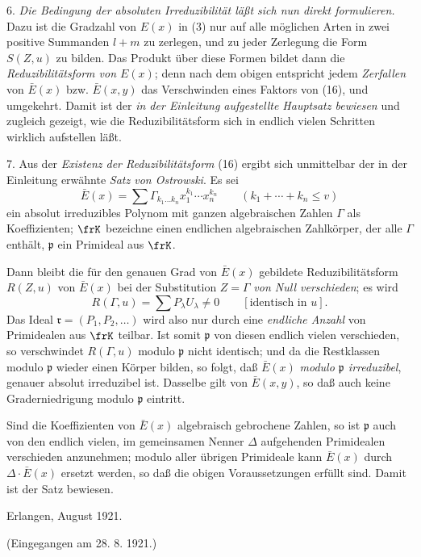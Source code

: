 6. \emph{Die Bedingung der absoluten Irreduzibilität läßt sich nun direkt formulieren.} Dazu ist die Gradzahl von $E(x)$ in (3) nur auf alle möglichen Arten in zwei positive Summanden $l+m$ zu zerlegen, und zu jeder Zerlegung die Form $S(Z,u)$ zu bilden. Das Produkt über diese Formen
bildet dann die \emph{Reduzibilitätsform von $E(x)$}; denn nach dem obigen entspricht jedem \emph{Zerfallen} von $\bar E(x)$ bzw. $\bar E(x,y)$ das Verschwinden eines Faktors von (16), und umgekehrt. Damit ist der \emph{in der Einleitung aufgestellte Hauptsatz bewiesen} und zugleich gezeigt, wie die Reduzibilitätsform sich in endlich vielen Schritten wirklich aufstellen läßt.

7. Aus der \emph{Existenz der Reduzibilitätsform} (16) ergibt sich unmittelbar der in der Einleitung erwähnte \emph{Satz von Ostrowski}. Es sei
\[
 \bar E(x)=\sum \Gamma_{k_1\ldots k_n}x_1^{k_1}\cdots x_n^{k_n}
 \qquad(k_1+\cdots+k_n\le v)
\]
ein absolut irreduzibles Polynom mit ganzen algebraischen Zahlen $\Gamma$ als Koeffizienten; $\frK$ bezeichne einen endlichen algebraischen Zahlkörper, der alle $\Gamma$ enthält, $\mathfrak p$ ein Primideal aus $\frK$.

Dann bleibt die für den genauen Grad von $\bar E(x)$ gebildete Reduzibilitätsform $R(Z,u)$ von $\bar E(x)$ bei der Substitution $Z=\Gamma$ \emph{von Null verschieden}; es wird
\[
 R(\Gamma,u)=\sum P_\lambda U_\lambda\ne0\qquad[\text{identisch in }u].
\]
Das Ideal $\mathfrak r=(P_1,P_2,\ldots)$ wird also nur durch eine \emph{endliche Anzahl} von Primidealen aus $\frK$ teilbar. Ist somit $\mathfrak p$ von diesen endlich vielen verschieden, so verschwindet $R(\Gamma,u)$ modulo $\mathfrak p$ nicht identisch; und da die Restklassen modulo $\mathfrak p$ wieder einen Körper bilden, so folgt, daß $\bar E(x)$ \emph{modulo $\mathfrak p$ irreduzibel}, genauer absolut irreduzibel ist. Dasselbe gilt von $\bar E(x,y)$, so daß auch keine Graderniedrigung modulo $\mathfrak p$ eintritt.

Sind die Koeffizienten von $\bar E(x)$ algebraisch gebrochene Zahlen, so ist $\mathfrak p$ auch von den endlich vielen, im gemeinsamen Nenner $\Delta$ aufgehenden Primidealen verschieden anzunehmen; modulo aller übrigen Primideale kann $\bar E(x)$ durch $\Delta\cdot\bar E(x)$ ersetzt werden, so daß die obigen Voraussetzungen erfüllt sind. Damit ist der Satz bewiesen.

\begin{flushleft}
Erlangen, August 1921.
\end{flushleft}
\begin{center}
(Eingegangen am 28. 8. 1921.)
\end{center}

\clearpage
